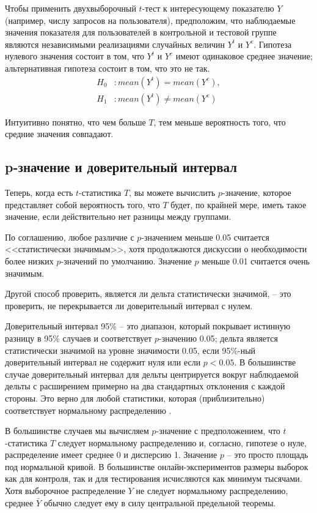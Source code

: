 \documentclass[%
	11pt,
	a4paper,
	utf8,
		]{article}
\begin{document}
Чтобы применить двухвыборочный $t$-тест к интересующему показателю $Y$ (например, числу запросов на пользователя), предположим, что наблюдаемые значения показателя для пользователей в контрольной и тестовой группе являются независимыми реализациями случайных величин $Y^t$ и $Y^c$. Гипотеза нулевого значения состоит в том, что $Y^t$ и $Y^c$ имеют одинаковое среднее значение; альтернативная гипотеза состоит в том, что это не так.
\begin{align*}
	H_0&: mean(Y^t) = mean(Y^c),\\
	H_1&: mean(Y^t) \neq mean(Y^c)
\end{align*}

Интуитивно понятно, что чем больше $T$, тем меньше вероятность того, что средние значения совпадают.

\subsection{p-значение и доверительный интервал}

Теперь, когда есть $t$-статистика $T$, вы можете вычислить $p$-значение, которое представляет собой вероятность того, что $T$ будет, по крайней мере, иметь такое значение, если действительно нет разницы между группами.

По соглашению, любое различие с $p$-значением меньше 0.05 считается <<статистически значимым>>, хотя продолжаются дискуссии о необходимости более низких $p$-значений по умолчанию. Значение $p$ меньше 0.01 считается очень значимым.

Другой способ проверить, является ли дельта статистически значимой, -- это проверить, не перекрывается ли доверительный интервал с нулем. 

Доверительный интервал 95\% -- это диапазон, который покрывает истинную разницу в 95\% случаев и соответствует $p$-значению 0.05; дельта является статистически значимой на уровне значимости 0.05, если 95\%-ный доверительный интервал не содержит нуля или если $p < 0.05$. В большинстве случае доверительный интервал для дельты центрируется вокруг наблюдаемой дельты с расширением примерно на два стандартных отклонения с каждой стороны. Это верно для любой статистики, которая (приблизительно) соответствует нормальному распределению \cite[]{kohavi:ab-tests-2021}.

В большинстве случаев мы вычисляем $p$-значение с предположением, что $t$-статистика $T$ следует нормальному распределению и, согласно, гипотезе о нуле, распределение имеет среднее 0 и дисперсию 1. Значение $p$ -- это просто площадь под нормальной кривой. В большинстве онлайн-экспериментов размеры выборок как для контроля, так и для тестирования исчисляются как минимум тысячами. Хотя выборочное распределение $Y$ не следует нормальному распределению, среднее $\bar{Y}$ обычно следует ему в силу центральной предельной теоремы.
\end{document}
